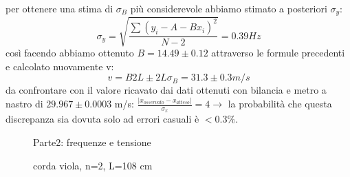 \documentclass[a4paper]{article}
\theoremstyle{definition}
\begin{document}
\noindent per ottenere una stima di \(\sigma_{B}\) più considerevole abbiamo stimato a posteriori \(\sigma_{y}\):
\[\sigma_{y} = \sqrt{\frac{\sum (y_{i}-A-Bx_{i})^{2}}{N-2}} = 0.39 Hz\]
così facendo abbiamo ottenuto \(B = 14.49 \pm 0.12\) attraverso le formule precedenti e calcolato nuovamente v:
\[v = B2L \pm 2L \sigma_{B} = 31.3 \pm 0.3 m/s\]
da confrontare con il valore ricavato dai dati ottenuti con bilancia e metro a nastro di \(29.967 \pm 0.0003\) m/s: \(\frac{\left | x_{osservato}-x_{atteso} \right |}{\sigma_{x}}= 4 \rightarrow \) la probabilità che questa discrepanza sia dovuta solo ad errori casuali è \(< 0.3 \%\).

\begin{figure}[!ht]
	\captionsetup{labelformat=empty}
	\caption{Parte2: frequenze e tensione}
\caption{corda viola, n=2, L=108 cm}
\end{figure}

 
\begin{figure}[!htbp]
\end{figure}
\end{document}
